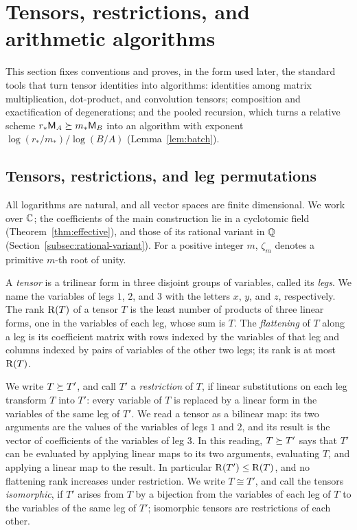 \section{Tensors, restrictions, and arithmetic algorithms}
\label{sec:preliminaries}

This section fixes conventions and proves, in the form used later, the
standard tools that turn tensor identities into algorithms: identities
among matrix multiplication, dot-product, and convolution tensors;
composition and exactification of degenerations; and the pooled recursion,
which turns a relative scheme \(r_*\mathsf M_A\succeq m_*\mathsf M_B\) into an algorithm
with exponent \(\log(r_*/m_*)/\log(B/A)\) (Lemma~\ref{lem:batch}).

\subsection{Tensors, restrictions, and leg permutations}
\label{subsec:prelim-conventions}

All logarithms are natural, and all vector spaces are finite dimensional.
We work over \(\mathbb C\); the coefficients of the main construction lie in a
cyclotomic field (Theorem~\ref{thm:effective}), and those of its
rational variant in \(\mathbb Q\) (Section~\ref{subsec:rational-variant}). For a positive integer
\(m\), \(\zeta_m\) denotes a primitive \(m\)-th root of unity.

A \emph{tensor} is a trilinear form in three disjoint groups of variables,
called its \emph{legs}. We name the variables of legs \(1\), \(2\), and
\(3\) with the letters \(x\), \(y\), and \(z\), respectively. The rank
\(\operatorname{R}(T)\) of a tensor \(T\) is the least number of products of three linear
forms, one in the variables of each leg, whose sum is \(T\). The
\emph{flattening} of \(T\) along a leg is its coefficient matrix with rows
indexed by the variables of that leg and columns indexed by pairs of
variables of the other two legs; its rank is at most \(\operatorname{R}(T)\).

We write \(T\succeq T'\), and call \(T'\) a \emph{restriction} of \(T\), if
linear substitutions on each leg transform \(T\) into \(T'\): every variable
of \(T\) is replaced by a linear form in the variables of the same leg of
\(T'\). We read a tensor as a bilinear map: its two arguments are the values
of the variables of legs \(1\) and \(2\), and its result is the vector of
coefficients of the variables of leg \(3\). In this reading, \(T\succeq T'\)
says that \(T'\) can be evaluated by applying linear maps to its two
arguments, evaluating \(T\), and applying a linear map to the result. In
particular \(\operatorname{R}(T')\le\operatorname{R}(T)\), and no flattening rank increases under
restriction. We write \(T\cong T'\), and call the tensors
\emph{isomorphic}, if \(T'\) arises from \(T\) by a bijection from the
variables of each leg of \(T\) to the variables of the same leg of \(T'\);
isomorphic tensors are restrictions of each other.

